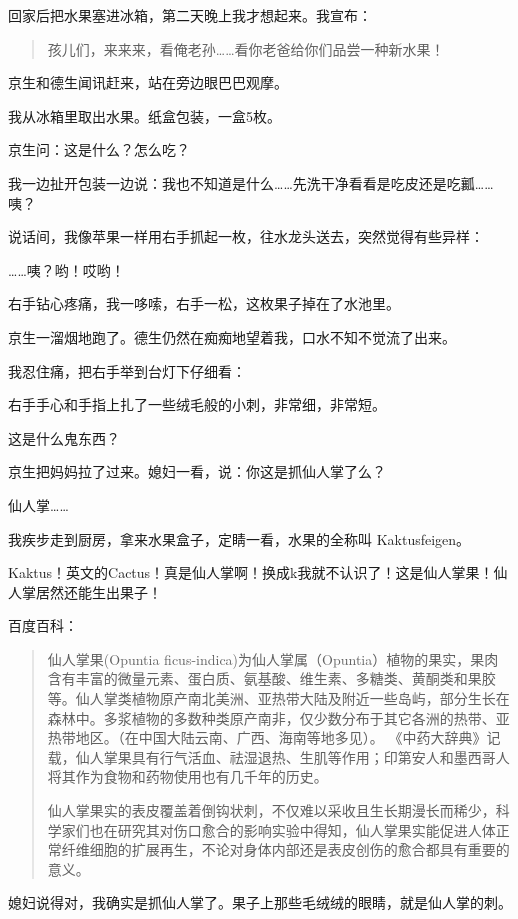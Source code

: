 \documentclass[twoside,openright,headings=optiontohead]{ctexbook} %
\begin{document}
{回家后把水果塞进冰箱，第二天晚上我才想起来。我宣布：

\begin{quote}
孩儿们，来来来，看俺老孙\ldots{}\ldots{}看你老爸给你们品尝一种新水果！
\end{quote}

京生和德生闻讯赶来，站在旁边眼巴巴观摩。

我从冰箱里取出水果。纸盒包装，一盒5枚。

京生问：这是什么？怎么吃？

我一边扯开包装一边说：我也不知道是什么\ldots{}\ldots{}先洗干净看看是吃皮还是吃瓤\ldots{}\ldots{}咦？

说话间，我像苹果一样用右手抓起一枚，往水龙头送去，突然觉得有些异样：

\ldots{}\ldots{}咦？哟！哎哟！

右手钻心疼痛，我一哆嗦，右手一松，这枚果子掉在了水池里。

京生一溜烟地跑了。德生仍然在痴痴地望着我，口水不知不觉流了出来。

我忍住痛，把右手举到台灯下仔细看：

右手手心和手指上扎了一些绒毛般的小刺，非常细，非常短。

这是什么鬼东西？

京生把妈妈拉了过来。媳妇一看，说：你这是抓仙人掌了么？

仙人掌\ldots{}\ldots{}

我疾步走到厨房，拿来水果盒子，定睛一看，水果的全称叫 Kaktusfeigen。

Kaktus！英文的Cactus！真是仙人掌啊！换成k我就不认识了！这是仙人掌果！仙人掌居然还能生出果子！

百度百科：

\begin{quote}
仙人掌果(Opuntia
ficus-indica)为仙人掌属（Opuntia）植物的果实，果肉含有丰富的微量元素、蛋白质、氨基酸、维生素、多糖类、黄酮类和果胶等。仙人掌类植物原产南北美洲、亚热带大陆及附近一些岛屿，部分生长在森林中。多浆植物的多数种类原产南非，仅少数分布于其它各洲的热带、亚热带地区。（在中国大陆云南、广西、海南等地多见）。
《中药大辞典》记载，仙人掌果具有行气活血、祛湿退热、生肌等作用；印第安人和墨西哥人将其作为食物和药物使用也有几千年的历史。

仙人掌果实的表皮覆盖着倒钩状刺，不仅难以采收且生长期漫长而稀少，科学家们也在研究其对伤口愈合的影响实验中得知，仙人掌果实能促进人体正常纤维细胞的扩展再生，不论对身体内部还是表皮创伤的愈合都具有重要的意义。
\end{quote}

媳妇说得对，我确实是抓仙人掌了。果子上那些毛绒绒的眼睛，就是仙人掌的刺。

}
\end{document}
